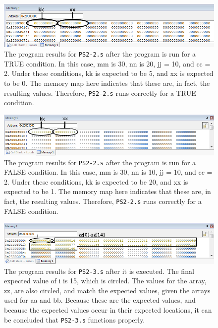 \documentclass{article}
\begin{document}
\begin{figure}[htbp]
	\centering
	\includegraphics[width=\textwidth,keepaspectratio]{ps2-2_true}
	\caption{The program results for \texttt{PS2-2.s} after the program is run for a TRUE condition. In this case, mm is 30, nn is 20, jj = 10, and cc = 2. Under these conditions, kk is expected to be 5, and xx is expected to be 0. The memory map here indicates that these are, in fact, the resulting values. Therefore, \texttt{PS2-2.s} runs correctly for a TRUE condition.   }
	\label{fig:PS2-2_true}
\end{figure}
\begin{figure}[htbp]
	\centering
	\includegraphics[width=\textwidth,keepaspectratio]{ps2-2_false}
	\caption{The program results for \texttt{PS2-2.s} after the program is run for a FALSE condition. In this case, mm is 30, nn is 10, jj = 10, and cc = 2. Under these conditions, kk is expected to be  20, and xx is expected to be 1. The memory map here indicates that these are, in fact, the resulting values. Therefore, \texttt{PS2-2.s} runs correctly for a FALSE condition.  }
	\label{fig:PS2-2_false}
\end{figure}
\begin{figure}[!ht]
	\centering
	\includegraphics[width=\textwidth,keepaspectratio]{ps2-3_mem}
	\caption{The program results for \texttt{PS2-3.s} after it is executed. The final expected value of i is 15, which is circled. The values for the array, zz, are also circled, and match the expected values, given the arrays used for aa and bb. Because these are the expected values, and because the expected values occur in their expected locations, it can be concluded that \texttt{PS2-3.s} functions properly. }
	\label{fig:PS2-3_mem}
\end{figure}
\end{document}
